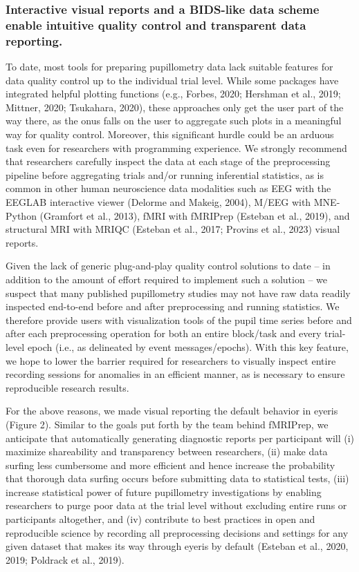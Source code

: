 \subsubsection{Interactive visual reports and a BIDS-like data scheme enable intuitive quality control and transparent data reporting.}
To date, most tools for preparing pupillometry data lack suitable features for data quality control up to the individual trial level. While some packages have integrated helpful plotting functions (e.g., Forbes, 2020; Hershman et al., 2019; Mittner, 2020; Tsukahara, 2020), these approaches only get the user part of the way there, as the onus falls on the user to aggregate such plots in a meaningful way for quality control. Moreover, this significant hurdle could be an arduous task even for researchers with programming experience. We strongly recommend that researchers carefully inspect the data at each stage of the preprocessing pipeline before aggregating trials and/or running inferential statistics, as is common in other human neuroscience data modalities such as EEG with the EEGLAB interactive viewer (Delorme and Makeig, 2004), M/EEG with MNE-Python (Gramfort et al., 2013), fMRI with fMRIPrep (Esteban et al., 2019), and structural MRI with MRIQC (Esteban et al., 2017; Provins et al., 2023) visual reports.

Given the lack of generic plug-and-play quality control solutions to date – in addition to the amount of effort required to implement such a solution – we suspect that many published pupillometry studies may not have raw data readily inspected end-to-end before and after preprocessing and running statistics. We therefore provide users with visualization tools of the pupil time series before and after each preprocessing operation for both an entire block/task and every trial-level epoch (i.e., as delineated by event messages/epochs). With this key feature, we hope to lower the barrier required for researchers to visually inspect entire recording sessions for anomalies in an efficient manner, as is necessary to ensure reproducible research results.

For the above reasons, we made visual reporting the default behavior in eyeris (Figure 2). Similar to the goals put forth by the team behind fMRIPrep, we anticipate that automatically generating diagnostic reports per participant will (i) maximize shareability and transparency between researchers, (ii) make data surfing less cumbersome and more efficient and hence increase the probability that thorough data surfing occurs before submitting data to statistical tests, (iii) increase statistical power of future pupillometry investigations by enabling researchers to purge poor data at the trial level without excluding entire runs or participants altogether, and (iv) contribute to best practices in open and reproducible science by recording all preprocessing decisions and settings for any given dataset that makes its way through eyeris by default (Esteban et al., 2020, 2019; Poldrack et al., 2019).

